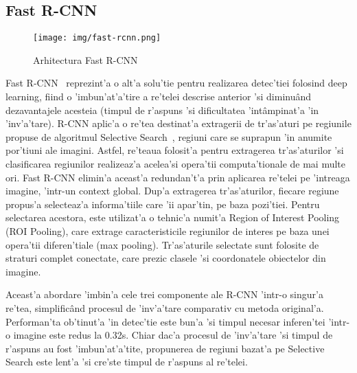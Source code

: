 \documentclass[12pt,a4paper,twoside]{report}
\begin{document}
\subsection{Fast R-CNN}
\begin{figure}[H]
  \texttt{[image: img/fast-rcnn.png]}
  \centering
  \caption{Arhitectura Fast R-CNN\protect\footnotemark}
\end{figure}

Fast R-CNN~\cite{FastR-CNN} reprezint'a o alt'a solu'tie pentru realizarea detec'tiei folosind deep learning, fiind o 'imbun'at'a'tire a re'telei descrise anterior 'si diminu\^and dezavantajele acesteia (timpul de r'aspuns 'si dificultatea 'int\^ampinat'a 'in 'inv'a'tare). R-CNN aplic'a o re'tea destinat'a extragerii de tr'as'aturi pe regiunile propuse de algoritmul Selective Search~\cite{SelectiveSearch}, regiuni care se suprapun 'in anumite por'tiuni ale imagini. Astfel, re'teaua folosit'a pentru extragerea tr'as'aturilor 'si clasificarea regiunilor realizeaz'a acelea'si opera'tii computa'tionale de mai multe ori. Fast R-CNN elimin'a aceast'a redundan't'a prin aplicarea re'telei pe 'intreaga imagine, 'intr-un context global. Dup'a extragerea tr'as'aturilor, fiecare regiune propus'a selecteaz'a informa'tiile care 'ii apar'tin, pe baza pozi'tiei. Pentru selectarea acestora, este utilizat'a o tehnic'a numit'a Region of Interest Pooling (ROI Pooling), care extrage caracteristicile regiunilor de interes pe baza unei opera'tii diferen'tiale (max pooling). Tr'as'aturile selectate sunt folosite de straturi complet conectate, care prezic clasele 'si coordonatele obiectelor din imagine.

Aceast'a abordare 'imbin'a cele trei componente ale R-CNN 'intr-o singur'a re'tea, simplific\^and procesul de 'inv'a'tare comparativ cu metoda original'a. Performan'ta ob'tinut'a 'in detec'tie este bun'a 'si timpul necesar inferen'tei 'intr-o imagine este redus la 0.32s. Chiar dac'a procesul de 'inv'a'tare 'si timpul de r'aspuns au fost 'imbun'at'a'tite, propunerea de regiuni bazat'a pe Selective Search este lent'a 'si cre'ste timpul de r'aspuns al re'telei.
\end{document}
